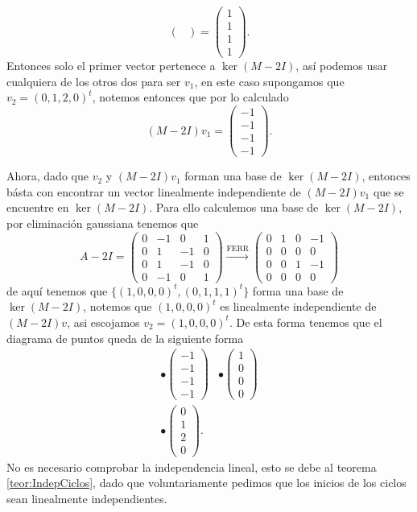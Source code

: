 \begin{example}
\[\begin{pmatrix}
      \end{pmatrix} = \begin{pmatrix}
        1 \\ 1 \\ 1 \\ 1
      \end{pmatrix}.
  \]
  Entonces solo el primer vector pertenece a $\ker(M-2I)$, así podemos usar cualquiera de los otros dos para ser $v_1$, en este caso supongamos que $v_2 = (0,1,2,0)^t$, notemos entonces que por lo calculado
    \[
      (M-2I)v_1 = \begin{pmatrix}
        -1 \\ -1 \\ -1 \\ -1
      \end{pmatrix}.
    \]

  Ahora, dado que $v_2$ y $(M-2I)v_1$ forman una base de $\ker(M-2I)$, entonces básta con encontrar un vector linealmente independiente de $(M-2I)v_1$ que se encuentre en $\ker(M-2I)$. Para ello calculemos una base de $\ker(M-2I)$, por eliminación gaussiana tenemos que
    \[
      A-2I = \begin{pmatrix} 0 & -1 & 0 & 1 \\ 0 & 1 & -1 & 0 \\ 0 & 1 & -1 & 0 \\ 0 & -1 &0 & 1 \end{pmatrix}
        \xrightarrow{\text{FERR}}
        \begin{pmatrix} 0 & 1 & 0 & -1 \\ 0 & 0 & 0 & 0 \\ 0 & 0 & 1 & -1 \\ 0 & 0 & 0 & 0 \end{pmatrix}
    \]
  de aquí tenemos que $\{(1,0,0,0)^t, (0,1,1,1)^t\}$ forma una base de $\ker(M-2I)$, notemos que $(1,0,0,0)^t$ es linealmente independiente de $(M-2I)v$, asi escojamos $v_2 = (1,0,0,0)^t$. De esta forma tenemos que el diagrama de puntos queda de la siguiente forma
  \[
    \begin{array}{ll}
      \bullet \begin{pmatrix} -1 \\ -1 \\ -1 \\ -1 \end{pmatrix} & \bullet \begin{pmatrix}1 \\ 0 \\ 0 \\ 0\end{pmatrix}\\
      \bullet \begin{pmatrix} 0 \\ 1 \\ 2 \\ 0 \end{pmatrix}.
    \end{array}
  \]
  No es necesario comprobar la independencia lineal, esto se debe al teorema \ref{teor:IndepCiclos}, dado que voluntariamente pedimos que los inicios de los ciclos sean linealmente independientes.


\end{example}

